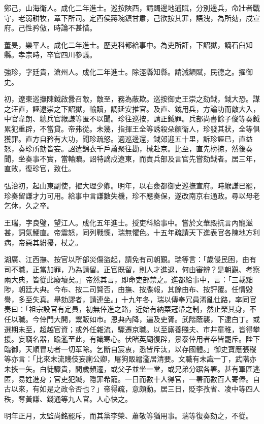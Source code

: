 \begin{pinyinscope}
鄭己，山海衛人。成化二年進士。巡按陜西，請蠲邊地逋賦，分別邊兵，命壯者戰守，老弱耕牧，章下所司。定西侯蔣琬鎮甘肅，己欲按其罪，語洩，為所劾，戍宣府。己性矜傲，時論不甚惜。

董旻，樂平人。成化二年進士。歷吏科都給事中。為吏所訐，下詔獄，謫石臼知縣。孝宗時，卒官四川參議。

強珍，字廷貴，滄州人。成化二年進士。除涇縣知縣。請減額賦，民德之。擢御史。

初，遼東巡撫陳鉞啟釁召敵，敵至，務為蔽欺。巡按御史王崇之劾鉞，鉞大恐。謀之汪直，誣逮崇之下詔獄，輸贖，調延安推官。及直、鉞用兵，方論功而敵大入，中官韋朗、總兵官緱謙等匿不以聞。珍往巡按，請正鉞罪。兵部尚書餘子俊等奏鉞累犯重辟，不當貸。帝弗從。未幾，指揮王全等誘殺朵顏衛人，珍發其狀，全等俱獲罪。直方自矜有大功，聞珍疏怒。適巡邊還，鉞郊迎五十里，訴珍誣已，直益怒，奏珍所劾皆妄。詔遣錦衣千戶蕭聚往勘，械赴京。比至，直先榜掠，然後奏聞，坐奏事不實，當輸贖。詔特謫戍遼東，而責兵部及言官先嘗劾鉞者。居三年，直敗，復珍官，致仕。

弘治初，起山東副使，擢大理少卿。明年，以右僉都御史巡撫宣府。時緱謙已罷，珍奏留謙才力可用。給事中言謙數失機，珍不應奏保，遂改南京右通政。尋以母老乞休，久之卒。

王瑞，字良璧，望江人。成化五年進士。授吏科給事中。嘗於文華殿抗言內寵滋甚，詞氣鯁直。帝震怒，同列戰慄，瑞無懼色。十五年疏請天下進表官各陳地方利病，帝惡其紛擾，杖之。

湖廣、江西撫、按官以所部災傷盜起，請免有司朝覲。瑞等言：「歲侵民困，由有司不職，正當加罪，乃為請留。正官既留，則人才進退，何由審辨？是朝覲、考察兩大典，皆從此廢壞矣。」帝然其言，即命吏部禁之。進都給事中，言：「三載黜陟，朝廷大典。今布、按二司賢否，由撫、按牒報，其餘由布、按評覆。任情毀譽，多至失真。舉劾謬者，請連坐。」十九年冬，瑞以傳奉冗員淆亂仕路，率同官奏曰：「祖宗設官有定員，初無倖進之路，近始有納粟冠帶之制，然止榮其身，不任以職。今倖門大開，鬻販如市。恩典內降，遍及吏胥。武階蔭襲，下逮白丁。或選期未至，超越官資；或外任雜流，驟遷京職。以至廝養賤夫、市井童稚，皆得攀援。妄竊名器，踰濫至此，有識寒心。伏睹英廟復辟，景泰倖用者卒皆罷斥。陛下臨御，天順冒功者一切革除。乞斷自宸衷，悉皆斥汰，以存國體。」御史寶應張稷等亦言：「比來末流賤伎妄廁公卿，屠狗販繒濫居清要。文職有未識一丁，武階亦未挾一矢。白徒驟貴，間歲頻遷，或父子並坐一堂，或兄弟分踞各署。甚有軍匠逃匿，易姓進身；官吏犯贓，隱罪希寵。一日而數十人得官，一署而數百人寄俸。自古以來，有如是之政令否也？」帝得疏，意頗動。居三日，貶李孜省、凌中等四人秩，奪黃謙、錢通等九人官。人心快之。

明年正月，太監尚銘罷斥，而其黨李榮、蕭敬等猶用事。瑞等復奏劾之，不從。


\end{pinyinscope}
